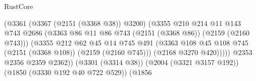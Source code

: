 \begin{lexlean}{RustCore}
\begin{coremodule}
                                                      (@3361
                                                        (@3367 (@2151 (@3368 @38)) @3200)
                                                        (@3355
                                                          @210
                                                          @214
                                                          @11
                                                          @143
                                                          @743
                                                          @2686
                                                          (@3363
                                                            @86
                                                            @11
                                                            @86
                                                            @743
                                                            (@2151 (@3368 @86))
                                                            (@2159 (@2160 @743)))
                                                          (@3355
                                                            @212
                                                            @62
                                                            @45
                                                            @14
                                                            @745
                                                            @491
                                                            (@3363
                                                              @108
                                                              @45
                                                              @108
                                                              @745
                                                              (@2151 (@3368 @108))
                                                              (@2159 (@2160 @745)))
                                                            (@2168 @3270 @420)))))
                                                    @2353
                                                    @2356
                                                    @2359
                                                    @2362))
                                                (@3301 (@3314 @38))
                                                (@2004 (@3321 @3157 @192))
                                                (@1850 (@3330 @192 @40 @722 @529))
                                                (@1856

\end{coremodule}
\end{lexlean}
